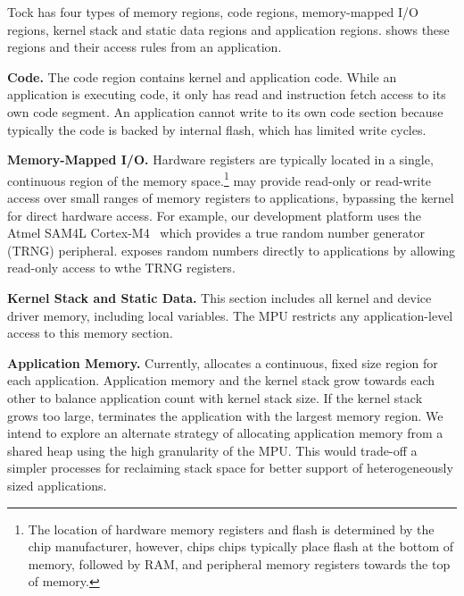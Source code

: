 Tock has four types of memory regions, code regions, memory-mapped I/O regions,
kernel stack and static data regions and application regions.
 shows these regions and their access rules from
an application.

{\bf Code.}
The code region contains kernel and application code. While an application is
executing code, it only has read and instruction fetch access to its own code
segment. An application cannot write to its own code section because typically
the code is backed by internal flash, which has limited write cycles.

{\bf Memory-Mapped I/O.}
Hardware registers are typically located in a single, continuous region of the
memory space.\footnote{The location of hardware memory registers and flash is
determined by the chip manufacturer, however, chips chips typically place
flash at the bottom of memory, followed by RAM, and peripheral memory
registers towards the top of memory.} \name may provide read-only or read-write
access over small ranges of memory registers to applications, bypassing the
kernel for direct hardware access. For example, our development platform uses
the Atmel SAM4L Cortex-M4~\cite{sam4l} which provides a true random number
generator (TRNG) peripheral. \name exposes random numbers directly to
applications by allowing read-only access to wthe TRNG registers.

{\bf Kernel Stack and Static Data.}
This section includes all kernel and device driver memory, including local
variables. The MPU restricts any application-level access to this memory section.

{\bf Application Memory.}
Currently, \name allocates a continuous, fixed size region for each
application.
Application memory and the kernel stack grow towards each other to balance
application count with kernel stack size. If the kernel stack
grows too large, \name terminates the application with the
largest memory region. We intend to explore an alternate strategy of
allocating application memory from a shared heap using the
high granularity of the MPU.
This would trade-off
a simpler processes for reclaiming stack space
for better support of heterogeneously sized applications.


